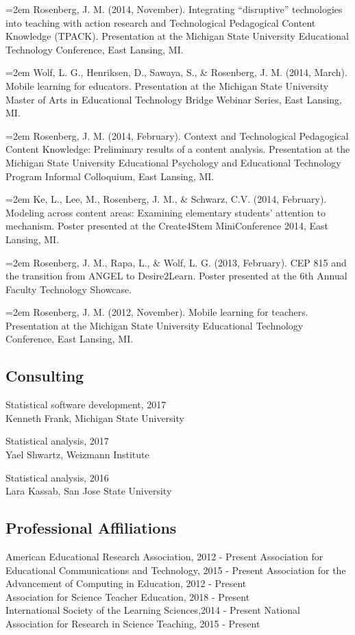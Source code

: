 \documentclass[]{article}
\begin{document}
\hangindent=2em Rosenberg, J. M. (2014, November). Integrating
``disruptive'' technologies into teaching with action research and
Technological Pedagogical Content Knowledge (TPACK). Presentation at the
Michigan State University Educational Technology Conference, East
Lansing, MI.

\hangindent=2em Wolf, L. G., Henriksen, D., Sawaya, S., \& Rosenberg, J.
M. (2014, March). Mobile learning for educators. Presentation at the
Michigan State University Master of Arts in Educational Technology
Bridge Webinar Series, East Lansing, MI.

\hangindent=2em Rosenberg, J. M. (2014, February). Context and
Technological Pedagogical Content Knowledge: Preliminary results of a
content analysis. Presentation at the Michigan State University
Educational Psychology and Educational Technology Program Informal
Colloquium, East Lansing, MI.

\hangindent=2em Ke, L., Lee, M., Rosenberg, J. M., \& Schwarz, C.V.
(2014, February). Modeling across content areas: Examining elementary
students' attention to mechanism. Poster presented at the Create4Stem
MiniConference 2014, East Lansing, MI.

\hangindent=2em Rosenberg, J. M., Rapa, L., \& Wolf, L. G. (2013,
February). CEP 815 and the transition from ANGEL to Desire2Learn. Poster
presented at the 6th Annual Faculty Technology Showcase.

\hangindent=2em Rosenberg, J. M. (2012, November). Mobile learning for
teachers. Presentation at the Michigan State University Educational
Technology Conference, East Lansing, MI.

\hypertarget{consulting}{%
\subsection{Consulting}\label{consulting}}

Statistical software development, 2017\\
Kenneth Frank, Michigan State University

Statistical analysis, 2017\\
Yael Shwartz, Weizmann Institute

Statistical analysis, 2016\\
Lara Kassab, San Jose State University

\hypertarget{professional-affiliations}{%
\subsection{Professional Affiliations}\label{professional-affiliations}}

American Educational Research Association, 2012 - Present Association
for Educational Communications and Technology, 2015 - Present
Association for the Advancement of Computing in Education, 2012 -
Present\\
Association for Science Teacher Education, 2018 - Present\\
International Society of the Learning Sciences,2014 - Present National
Association for Research in Science Teaching, 2015 - Present
\end{document}
